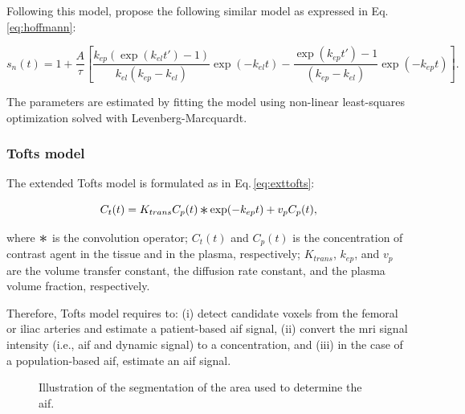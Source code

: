 Following this model, \citeauthor{hoffmann1995pharmacokinetic} propose the following similar model as expressed in Eq.\,\eqref{eq:hoffmann}:

\begin{equation}
  s_n(t) = 1 + \frac{A}{\tau} \left[ \frac{k_{ep} \left( \exp(k_{el} t') - 1 \right)}{k_{el}(k_{ep} - k_{el})} \exp(- k_{el} t) - \frac{\exp(k_{ep} t') - 1}{(k_{ep} - k_{el})} \exp(- k_{ep} t) \right].
  \label{eq:hoffmann}
\end{equation}

The parameters are estimated by fitting the model using non-linear least-squares optimization solved with Levenberg-Marcquardt.

\subsubsection{Tofts model}\label{sec:tofts}

The extended Tofts model is formulated as in Eq.\,\eqref{eq:exttofts}:

\begin{equation}
  C_t(t) = K_{trans} C_p(t) \Conv \exp(-k_{ep}t) + v_p C_p(t),
  \label{eq:exttofts}
\end{equation}

\noindent where $\Conv$ is the convolution operator; $C_t(t)$ and $C_p(t)$ is the concentration of contrast agent in the tissue and in the plasma, respectively; $K_{trans}$, $k_{ep}$, and $v_p$ are the volume transfer constant, the diffusion rate constant, and the plasma volume fraction, respectively.

Therefore, Tofts model requires to:
(i) detect candidate voxels from the femoral or iliac arteries and estimate a patient-based \ac{aif} signal,
(ii) convert the \ac{mri} signal intensity (i.e., \ac{aif} and dynamic signal) to a concentration, and
(iii) in the case of a population-based \ac{aif}, estimate an \ac{aif} signal.

\begin{figure}
  \centering
  \hspace*{\fill}
   \hfill
   \hfill
  \hspace*{\fill}
  \caption{Illustration of the segmentation of the area used to determine the \acs*{aif}.}
  \label{fig:aif}
\end{figure}

